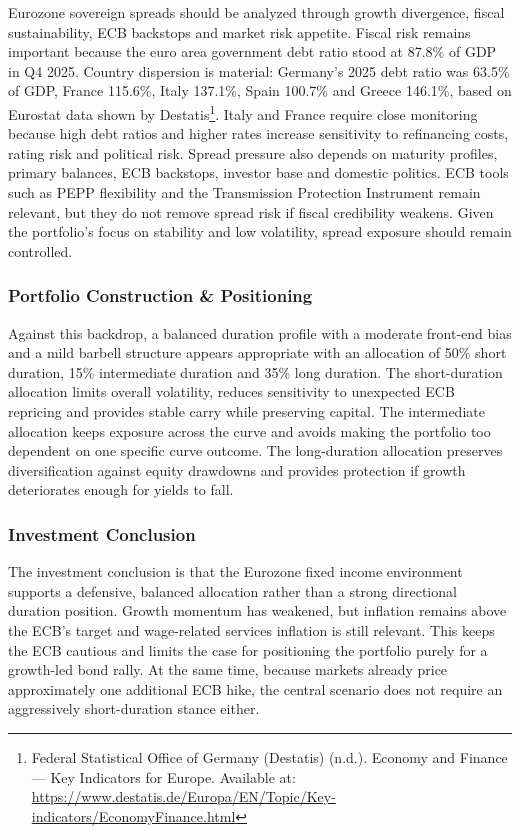 \documentclass[11pt,a4paper]{article}
\begin{document}
Eurozone sovereign spreads should be analyzed through growth divergence, fiscal sustainability, ECB backstops and market risk appetite. Fiscal risk remains important because the euro area government debt ratio stood at 87.8\% of GDP in Q4 2025. Country dispersion is material: Germany's 2025 debt ratio was 63.5\% of GDP, France 115.6\%, Italy 137.1\%, Spain 100.7\% and Greece 146.1\%, based on Eurostat data shown by Destatis\footnote{Federal Statistical Office of Germany (Destatis) (n.d.). Economy and Finance --- Key Indicators for Europe. Available at: \url{https://www.destatis.de/Europa/EN/Topic/Key-indicators/EconomyFinance.html}}. Italy and France require close monitoring because high debt ratios and higher rates increase sensitivity to refinancing costs, rating risk and political risk. Spread pressure also depends on maturity profiles, primary balances, ECB backstops, investor base and domestic politics. ECB tools such as PEPP flexibility and the Transmission Protection Instrument remain relevant, but they do not remove spread risk if fiscal credibility weakens. Given the portfolio's focus on stability and low volatility, spread exposure should remain controlled.

\subsubsection{Portfolio Construction \& Positioning}

Against this backdrop, a balanced duration profile with a moderate front-end bias and a mild barbell structure appears appropriate with an allocation of 50\% short duration, 15\% intermediate duration and 35\% long duration. The short-duration allocation limits overall volatility, reduces sensitivity to unexpected ECB repricing and provides stable carry while preserving capital. The intermediate allocation keeps exposure across the curve and avoids making the portfolio too dependent on one specific curve outcome. The long-duration allocation preserves diversification against equity drawdowns and provides protection if growth deteriorates enough for yields to fall.

\subsubsection{Investment Conclusion}

The investment conclusion is that the Eurozone fixed income environment supports a defensive, balanced allocation rather than a strong directional duration position. Growth momentum has weakened, but inflation remains above the ECB's target and wage-related services inflation is still relevant. This keeps the ECB cautious and limits the case for positioning the portfolio purely for a growth-led bond rally. At the same time, because markets already price approximately one additional ECB hike, the central scenario does not require an aggressively short-duration stance either.
\end{document}

